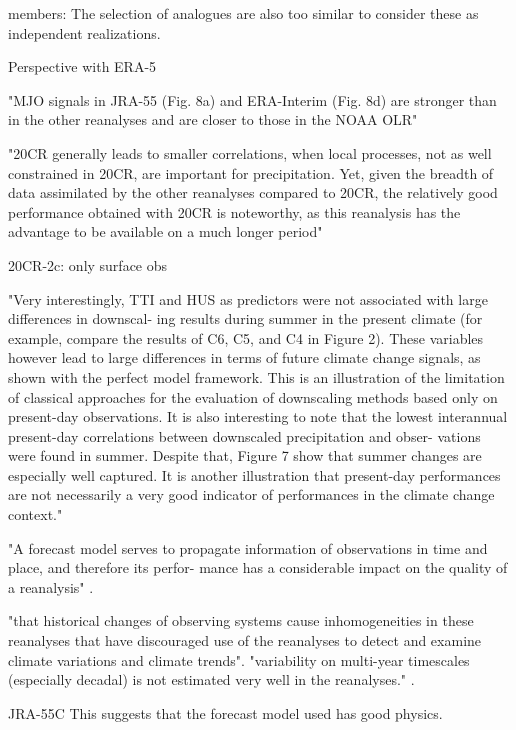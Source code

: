 \documentclass{ametsoc}
\begin{document}
members: The selection of analogues are also too similar to consider these as independent realizations.

Perspective with ERA-5


"MJO signals in JRA-55 (Fig. 8a) and ERA-Interim (Fig. 8d) are stronger than in the other reanalyses and are closer to those in the NOAA OLR" \cite{Harada2016}



"20CR generally leads to smaller correlations, when local processes, not as well constrained in 20CR, are important for precipitation. Yet, given the breadth of data assimilated by the other reanalyses compared to 20CR, the relatively good performance obtained with 20CR is noteworthy, as this reanalysis has the advantage to be available on a much longer period" \cite{Dayon2015}

20CR-2c: only surface obs


"Very interestingly, TTI and HUS as predictors were not associated with large differences in downscal- ing results during summer in the present climate (for example, compare the results of C6, C5, and C4 in Figure 2). These variables however lead to large differences in terms of future climate change signals, as shown with the perfect model framework. This is an illustration of the limitation of classical approaches for the evaluation of downscaling methods based only on present-day observations. It is also interesting to note that the lowest interannual present-day correlations between downscaled precipitation and obser- vations were found in summer. Despite that, Figure 7 show that summer changes are especially well captured. It is another illustration that present-day performances are not necessarily a very good indicator of performances in the climate change context." \citep{Dayon2015}

"A forecast model serves to propagate information of observations in time and place, and therefore its perfor- mance has a considerable impact on the quality of a reanalysis" \citep{Kobayashi2015}.

"that historical changes of observing systems cause inhomogeneities in these reanalyses that have discouraged use of the reanalyses to detect and examine climate variations and climate trends".
"variability on multi-year timescales (especially decadal) is not estimated very well in the reanalyses." 
\citep{Kobayashi2014}.

JRA-55C
This suggests that the forecast model used has good physics. 
\end{document}
